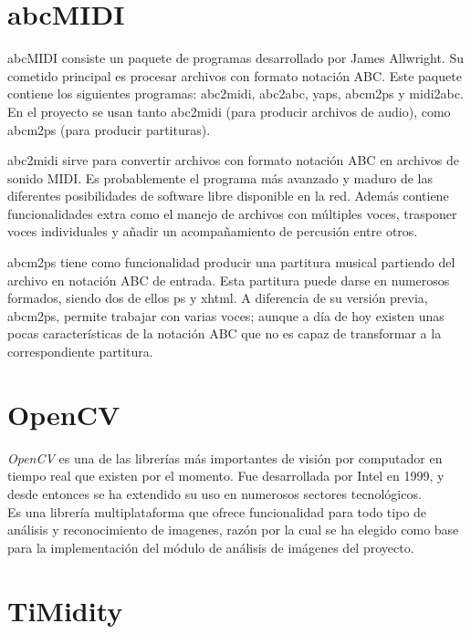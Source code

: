 \section{abcMIDI}
\label{sec:abcMIDI}

abcMIDI consiste un paquete de programas desarrollado por James Allwright. Su cometido principal es procesar archivos con formato notación ABC. Este paquete contiene los siguientes programas: abc2midi, abc2abc, yaps, abcm2ps y midi2abc. En el proyecto se usan tanto abc2midi (para producir archivos de audio), como abcm2ps (para producir partituras).

abc2midi sirve para convertir archivos con formato notación ABC en archivos de sonido MIDI. Es probablemente el programa más avanzado y maduro de las diferentes posibilidades de software libre disponible en la red. Además contiene funcionalidades extra como el manejo de archivos con múltiples voces, trasponer voces individuales y añadir un acompañamiento de percusión entre otros.

abcm2ps tiene como funcionalidad producir una partitura musical partiendo del archivo en notación ABC de entrada. Esta partitura puede darse en numerosos formados, siendo dos de ellos ps y xhtml. A diferencia de su versión previa, abcm2ps, permite trabajar con varias voces; aunque a día de hoy existen unas pocas características de la notación ABC que no es capaz de transformar a la correspondiente partitura.


\section{OpenCV}
\label{sec:OpenCV}

\emph{OpenCV} es una de las librerías más importantes de visión por computador en tiempo real que existen por el momento. Fue desarrollada por Intel en 1999, y desde entonces se ha extendido su uso en numerosos sectores tecnológicos.\\

Es una librería multiplataforma que ofrece funcionalidad para todo tipo de análisis y reconocimiento de imagenes, razón por la cual se ha elegido como base para la implementación del módulo de análisis de imágenes del proyecto.



\section{TiMidity}
\label{sec:Timidity}

